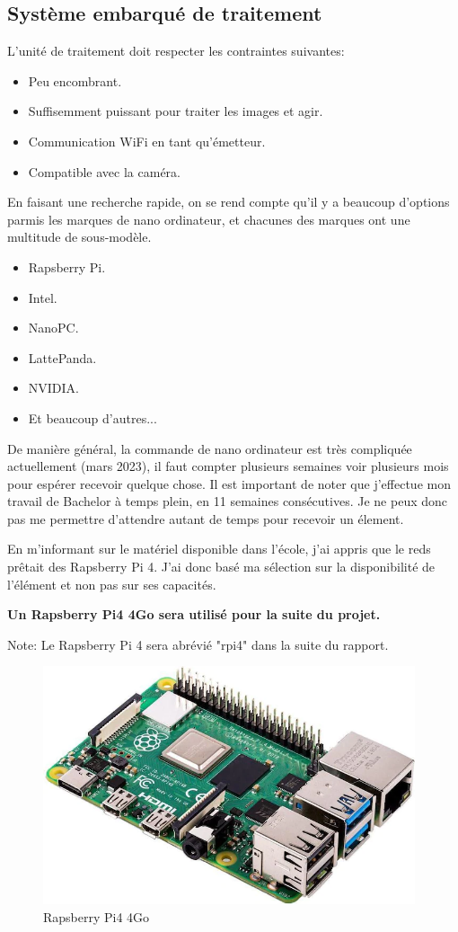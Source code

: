 \subsection{Système embarqué de traitement}
L'unité de traitement doit respecter les contraintes suivantes:
\begin{itemize}
    \item Peu encombrant.
    \item Suffisemment puissant pour traiter les images et agir.
    \item Communication WiFi en tant qu'émetteur.
    \item Compatible avec la caméra.
\end{itemize}
En faisant une recherche rapide, on se rend compte qu'il y a beaucoup d'options parmis les marques de nano ordinateur,
et chacunes des marques ont une multitude de sous-modèle.
\begin{itemize}
    \item Rapsberry Pi.
    \item Intel.
    \item NanoPC.
    \item LattePanda.
    \item NVIDIA.
    \item Et beaucoup d'autres...
\end{itemize}
De manière général, la commande de nano ordinateur est très compliquée actuellement (mars 2023), il faut compter plusieurs semaines voir plusieurs mois
pour espérer recevoir quelque chose. Il est important de noter que j'effectue mon travail de Bachelor à temps plein, en 11 semaines consécutives.
Je ne peux donc pas me permettre d'attendre autant de temps pour recevoir un élement.

En m'informant sur le matériel disponible dans l'école, j'ai appris que le \Gls{reds} prêtait des Rapsberry Pi 4.
J'ai donc basé ma sélection sur la disponibilité de l'élément et non pas sur ses capacités.

\textbf{Un Rapsberry Pi4 4Go sera utilisé pour la suite du projet.}

Note: Le Rapsberry Pi 4 sera abrévié "\Gls{rpi4}" dans la suite du rapport.

\begin{figure}[H]
    \centering
    \includegraphics[height=7cm]{assets/figures/rpi4.png}
    \caption{Rapsberry Pi4 4Go}
\end{figure}

